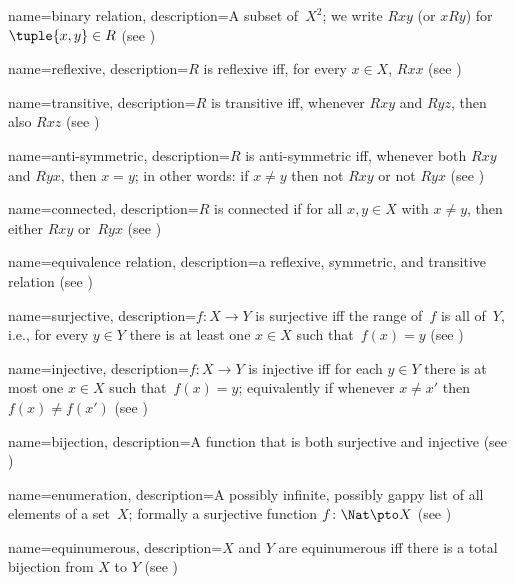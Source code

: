  {
  name=binary relation,
  description={A subset of~$X^{2}$; we write $Rxy$ (or $xRy$) for
    $\tuple{x, y} \in R$ (see )} }

 {
  name=reflexive,
  description={$R$ is reflexive iff, for every $x \in X$, $Rxx$ (see
    )} }

 {
  name=transitive,
  description={$R$ is transitive iff, whenever $Rxy$ and $Ryz$, then
    also $Rxz$ (see )} }

 {
  name=anti-symmetric,
  description={$R$ is anti-symmetric iff, whenever both $Rxy$ and
    $Ryx$, then $x=y$; in other words: if $x\neq y$ then not $Rxy$ or
    not $Ryx$ (see )} }

 {
  name=connected,
  description={$R$ is connected if for all $x, y\in X$
    with $x \neq y$, then either $Rxy$ or~$Ryx$ (see
    )} }

 {
  name={equivalence relation}, 
  description={a reflexive, symmetric, and transitive relation (see
    )} }

 {
  name={surjective},
  description={$f \colon X \rightarrow Y$ is {surjective} iff the
    range of~$f$ is all of~$Y$, i.e., for every $y \in Y$ there is at
    least one $x \in X$ such that~$f(x) = y$ (see
    )} }

 {
  name={injective}, 
  description={$f \colon X \rightarrow Y$ is {injective} iff for
    each $y \in Y$ there is at most one $x \in X$ such that~$f(x) =
    y$; equivalently if whenever $x \neq x'$ then $f(x) \neq f(x')$
    (see )} }

 {
  name={bijection},  
  description={A function that is both {surjective} and
    {injective} (see )} }

 {
  name=enumeration,  
  description={A possibly infinite, possibly gappy list of all
    {element}s of a set~$X$; formally a surjective function
    $f\colon \Nat \pto X$ (see )} }

 {
  name=equinumerous,
  description={$X$ and $Y$ are equinumerous iff there is a total
    bijection from $X$ to $Y$ (see )} }

